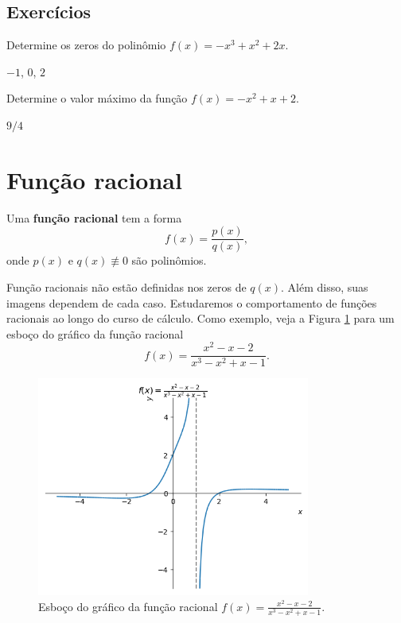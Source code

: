 \subsection*{Exercícios}

\begin{exer}
  Determine os zeros do polinômio $f(x) = -x^3+x^2+2x$.
\end{exer}
\begin{resp}
  $-1$, $0$, $2$
\end{resp}

\begin{exer}
  Determine o valor máximo da função $f(x) = -x^2 + x + 2$.
\end{exer}
\begin{resp}
  $9/4$
\end{resp}

\section{Função racional}\label{cap_funcao_sec_funracio}

Uma {\bf função racional} tem a forma
\begin{equation}
  f(x) = \frac{p(x)}{q(x)},
\end{equation}
onde $p(x)$ e $q(x)\not\equiv 0$ são polinômios.

Função racionais não estão definidas nos zeros de $q(x)$. Além disso, suas imagens dependem de cada caso. Estudaremos o comportamento de funções racionais ao longo do curso de cálculo. Como exemplo, veja a Figura \ref{fig:racional_grafico} para um esboço do gráfico da função racional
\begin{equation}
  f(x) = \frac{x^2-x-2}{x^3-x^2+x-1}.
\end{equation}

\begin{figure}[H]
  \centering
  \includegraphics[width=0.8\textwidth]{./cap_funcao/dados/fig_racional_grafico/fig_racional_grafico}
  \caption{Esboço do gráfico da função racional $f(x) = \frac{x^{2} - x - 2}{x^{3} - x^{2} + x - 1}$.}
  \label{fig:racional_grafico}
\end{figure}

